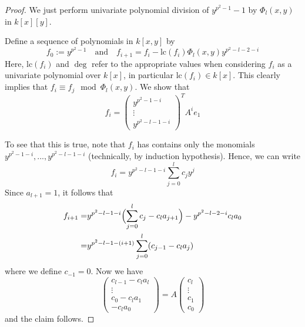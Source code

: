 \begin{proof}
    We just perform univariate polynomial division of $y^{p^2 - 1} - 1$ by $\Phi_l(x, y)$ in $k[x][y]$.

    Define a sequence of polynomials in $k[x, y]$ by
    \begin{equation}
        f_0 := y^{p^2 - 1} \quad \text{and} \quad f_{i + 1} = f_i - \mathrm{lc}(f_i) \Phi_l(x, y) y^{p^2 - l - 2 - i}
    \end{equation}
    Here, $\mathrm{lc}(f_i)$ and $\deg$ refer to the appropriate values when considering $f_i$ as a univariate polynomial over $k[x]$, in particular $\mathrm{lc}(f_i) \in k[x]$.
    This clearly implies that $f_i \equiv f_j \mod \Phi_l(x, y)$.
    We show that
    \begin{equation*}
        f_i = \left( \begin{matrix*}
            y^{p^2 - 1 - i} \\ \vdots \\ y^{p^2 - l - 1 - i}
        \end{matrix*} \right)^T A^i e_1
    \end{equation*}

    To see that this is true, note that $f_i$ has contains only the monomials $y^{p^2 - 1 - i}, ..., y^{p^2 - l - 1 - i}$ (technically, by induction hypothesis).
    Hence, we can write
    \begin{equation*}
        f_i = y^{p^2 - l - 1 - i} \sum_{j = 0}^l c_j y^j
    \end{equation*}
    Since $a_{l + 1} = 1$, it follows that
    \begin{align*}
        f_{i + 1} =& y^{p^2 - l - 1 - i} \Bigl( \sum_{j = 0}^l c_j - c_l a_{j + 1} \Bigr) - y^{p^2 - l - 2 - i} c_l a_0 \\
        =& y^{p^2 - l - 1 - (i + 1)} \sum_{j = 0}^l (c_{j - 1} - c_l a_j)
    \end{align*}
    where we define $c_{-1} = 0$.
    Now we have
    \begin{equation*}
        \left( \begin{matrix*}
            c_{l - 1} - c_l a_l \\
            \vdots \\
            c_0 - c_l a_1 \\
           - c_l a_0
        \end{matrix*} \right) = A \left( \begin{matrix*}
            c_l \\
            \vdots \\
            c_1 \\
            c_0
        \end{matrix*} \right)
    \end{equation*}
    and the claim follows.
\end{proof}
